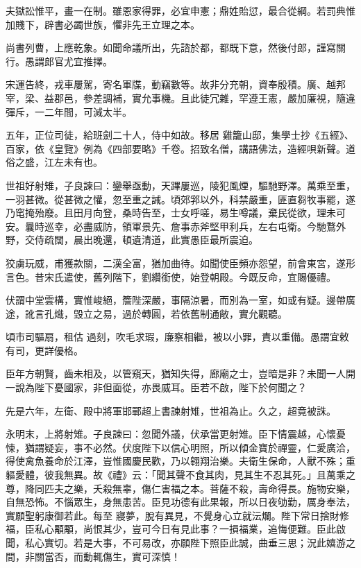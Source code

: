\begin{pinyinscope}
 夫獄訟惟平，畫一在制。雖恩家得罪，必宜申憲；鼎姓貽愆，最合從綱。若罰典惟加賤下，辟書必蠲世族，懼非先王立理之本。



 尚書列曹，上應乾象。如聞命議所出，先諮於都，都既下意，然後付郎，謹寫關行。愚謂郎官尤宜推擇。



 宋運告終，戎車屢駕，寄名軍牒，動竊數等。故非分充朝，資奉殷積。廣、越邦宰，梁、益郡邑，參差調補，實允事機。且此徒冗雜，罕遵王憲，嚴加廉視，隨違彈斥，一二年間，可減太半。



 五年，正位司徒，給班劍二十人，侍中如故。移居
 雞籠山邸，集學士抄《五經》、百家，依《皇覽》例為《四部要略》千卷。招致名僧，講語佛法，造經唄新聲。道俗之盛，江左未有也。



 世祖好射雉，子良諫曰：鑾舉亟動，天蹕屢巡，陵犯風煙，驅馳野澤。萬乘至重，一羽甚微。從甚微之懽，忽至重之誡。頃郊郛以外，科禁嚴重，匪直芻牧事罷，遂乃窀掩殆廢。且田月向登，桑時告至，士女呼嗟，易生噂議，棄民從欲，理未可安。曩時巡幸，必盡威防，領軍景先、詹事赤斧堅甲利兵，左右屯衛。今馳鶩外野，交侍疏闊，晨出晚還，頓遺清道，此實愚臣最所震迫。



 狡虜玩威，甫獲款關，二漢全富，猶加曲待。如聞使臣頻亦怨望，前會東宮，遂形言色。昔宋氏遣使，舊列階下，劉纘銜使，始登朝殿。今既反命，宜賜優禮。



 伏謂中堂雲構，實惟峻絕，簷陛深嚴，事隔涼暑，而別為一室，如或有疑。邊帶廣途，訛言孔熾，毀立之易，過於轉圓，若依舊制通敞，實允觀聽。



 頃市司驅扇，租估
 過刻，吹毛求瑕，廉察相繼，被以小罪，責以重備。愚謂宜敕有司，更詳優格。



 臣年方朝賢，齒未相及，以管窺天，猶知失得，廊廟之士，豈暗是非？未聞一人開一說為陛下憂國家，非但面從，亦畏威耳。臣若不啟，陛下於何聞之？



 先是六年，左衛、殿中將軍邯鄲超上書諫射雉，世祖為止。久之，超竟被誅。



 永明末，上將射雉。子良諫曰：忽聞外議，伏承當更射雉。臣下情震越，心懷憂悚，猶謂疑妄，事不必然。伏度陛下以信心明照，所以傾金寶於禪靈，仁愛廣洽，得使禽魚養命於江澤，豈惟國慶民歡，乃以翱翔治樂。夫衛生保命，人獸不殊；重軀愛體，彼我無異。故《禮》云：「聞其聲不食其肉，見其生不忍其死。」且萬乘之尊，降同匹夫之樂，夭殺無辜，傷仁害福之本。菩薩不殺，壽命得長。施物安樂，自無恐怖。不惱眾生，身無患苦。臣見功德有此果報，所以日夜劬勤，厲身奉法，實願聖躬康御若此。每至
 寢夢，脫有異見，不覺身心立就沄爛。陛下常日捨財修福，臣私心顒顒，尚恨其少，豈可今日有見此事？一損福業，追悔便難。臣此啟聞，私心實切。若是大事，不可易改，亦願陛下照臣此誠，曲垂三思；況此嬉游之間，非關當否，而動輒傷生，實可深慎！




\end{pinyinscope}
